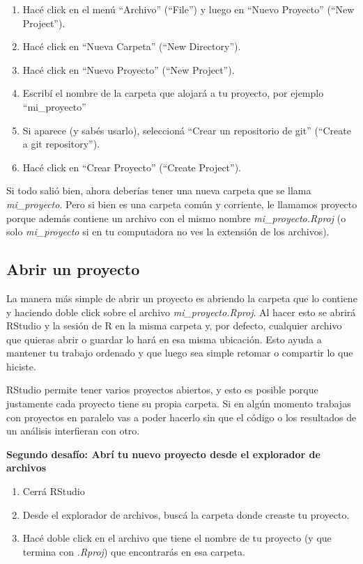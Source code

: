 \documentclass[
  openany]{book}
\providecommand{\tightlist}{%
  \setlength{\itemsep}{0pt}\setlength{\parskip}{0pt}}
\begin{document}
\begin{enumerate}
\def\labelenumi{\arabic{enumi}.}
\tightlist
\item
  Hacé click en el menú ``Archivo'' (``File'') y luego en ``Nuevo Proyecto'' (``New Project'').
\item
  Hacé click en ``Nueva Carpeta'' (``New Directory'').
\item
  Hacé click en ``Nuevo Proyecto'' (``New Project'').
\item
  Escribí el nombre de la carpeta que alojará a tu proyecto, por ejemplo ``mi\_proyecto''
\item
  Si aparece (y sabés usarlo), seleccioná ``Crear un repositorio de git'' (``Create a git repository'').
\item
  Hacé click en ``Crear Proyecto'' (``Create Project'').
\end{enumerate}

Si todo salió bien, ahora deberías tener una nueva carpeta que se llama \emph{mi\_proyecto}.
Pero si bien es una carpeta común y corriente, le llamamos proyecto porque además contiene un archivo con el mismo nombre \emph{mi\_proyecto.Rproj} (o solo \emph{mi\_proyecto} si en tu computadora no ves la extensión de los archivos).

\hypertarget{abrir-un-proyecto}{%
\subsection{Abrir un proyecto}\label{abrir-un-proyecto}}

La manera más simple de abrir un proyecto es abriendo la carpeta que lo contiene y haciendo doble click sobre el archivo \emph{mi\_proyecto.Rproj}.
Al hacer esto se abrirá RStudio y la sesión de R en la misma carpeta y, por defecto, cualquier archivo que quieras abrir o guardar lo hará en esa misma ubicación.
Esto ayuda a mantener tu trabajo ordenado y que luego sea simple retomar o compartir lo que hiciste.

RStudio permite tener varios proyectos abiertos, y esto es posible porque justamente cada proyecto tiene su propia carpeta.
Si en algún momento trabajas con proyectos en paralelo vas a poder hacerlo sin que el código o los resultados de un análisis interfieran con otro.

\textbf{Segundo desafío: Abrí tu nuevo proyecto desde el explorador de archivos}

\begin{enumerate}
\def\labelenumi{\arabic{enumi}.}
\tightlist
\item
  Cerrá RStudio
\item
  Desde el explorador de archivos, buscá la carpeta donde creaste tu proyecto.
\item
  Hacé doble click en el archivo que tiene el nombre de tu proyecto (y que termina con \emph{.Rproj}) que encontrarás en esa carpeta.
\end{enumerate}
\end{document}
